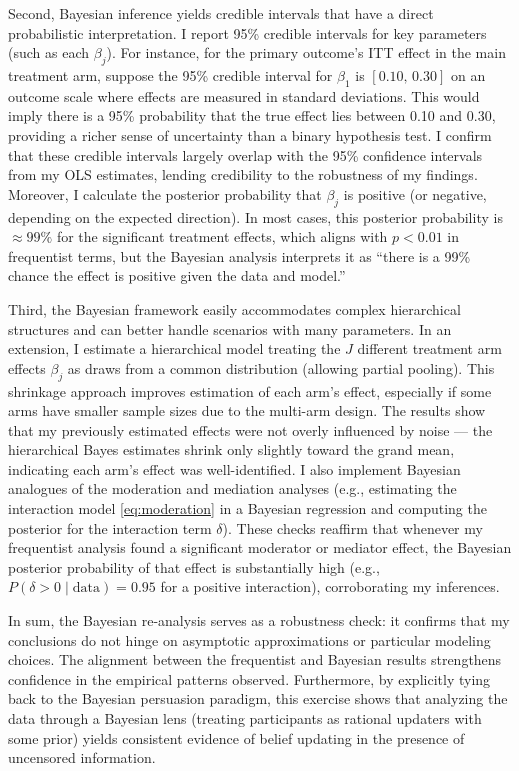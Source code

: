 \documentclass[12pt, american]{article}
\begin{document}
Second, Bayesian inference yields credible intervals that have a direct probabilistic interpretation. I report 95\% credible intervals for key parameters (such as each $\beta_j$). For instance, for the primary outcome’s ITT effect in the main treatment arm, suppose the 95\% credible interval for $\beta_1$ is $[0.10,\,0.30]$ on an outcome scale where effects are measured in standard deviations. This would imply there is a 95\% probability that the true effect lies between 0.10 and 0.30, providing a richer sense of uncertainty than a binary hypothesis test. I confirm that these credible intervals largely overlap with the 95\% confidence intervals from my OLS estimates, lending credibility to the robustness of my findings. Moreover, I calculate the posterior probability that $\beta_j$ is positive (or negative, depending on the expected direction). In most cases, this posterior probability is $\approx 99\%$ for the significant treatment effects, which aligns with $p<0.01$ in frequentist terms, but the Bayesian analysis interprets it as ``there is a 99\% chance the effect is positive given the data and model.''

Third, the Bayesian framework easily accommodates complex hierarchical structures and can better handle scenarios with many parameters. In an extension, I estimate a hierarchical model treating the $J$ different treatment arm effects $\beta_j$ as draws from a common distribution (allowing partial pooling). This shrinkage approach improves estimation of each arm’s effect, especially if some arms have smaller sample sizes due to the multi-arm design. The results show that my previously estimated effects were not overly influenced by noise — the hierarchical Bayes estimates shrink only slightly toward the grand mean, indicating each arm’s effect was well-identified. I also implement Bayesian analogues of the moderation and mediation analyses (e.g., estimating the interaction model \eqref{eq:moderation} in a Bayesian regression and computing the posterior for the interaction term $\delta$). These checks reaffirm that whenever my frequentist analysis found a significant moderator or mediator effect, the Bayesian posterior probability of that effect is substantially high (e.g., $P(\delta>0 \mid \text{data}) = 0.95$ for a positive interaction), corroborating my inferences.

In sum, the Bayesian re-analysis serves as a robustness check: it confirms that my conclusions do not hinge on asymptotic approximations or particular modeling choices. The alignment between the frequentist and Bayesian results strengthens confidence in the empirical patterns observed. Furthermore, by explicitly tying back to the Bayesian persuasion paradigm, this exercise shows that analyzing the data through a Bayesian lens (treating participants as rational updaters with some prior) yields consistent evidence of belief updating in the presence of uncensored information. 
\end{document}
